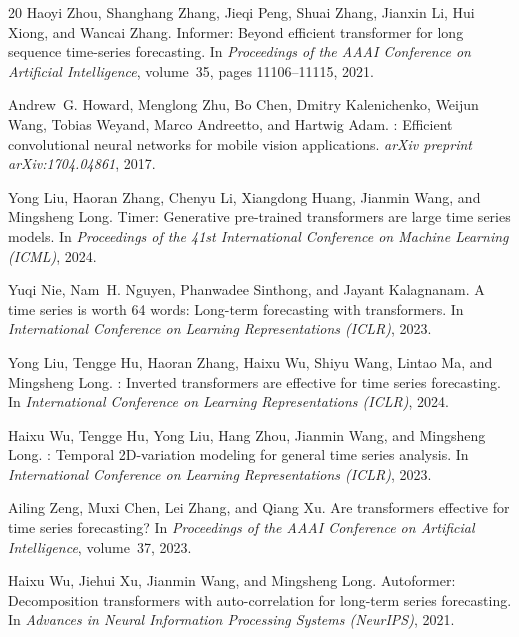 \documentclass{article}
\begin{document}
\begin{thebibliography}{20}
Haoyi Zhou, Shanghang Zhang, Jieqi Peng, Shuai Zhang, Jianxin Li, Hui Xiong, and Wancai Zhang.
\newblock Informer: Beyond efficient transformer for long sequence time-series forecasting.
\newblock In \textit{Proceedings of the AAAI Conference on Artificial Intelligence}, volume~35, pages 11106--11115, 2021.

Andrew~G. Howard, Menglong Zhu, Bo Chen, Dmitry Kalenichenko, Weijun Wang, Tobias Weyand, Marco Andreetto, and Hartwig Adam.
: Efficient convolutional neural networks for mobile vision applications.
\newblock \textit{arXiv preprint arXiv:1704.04861}, 2017.

Yong Liu, Haoran Zhang, Chenyu Li, Xiangdong Huang, Jianmin Wang, and Mingsheng Long.
\newblock Timer: Generative pre-trained transformers are large time series models.
\newblock In \textit{Proceedings of the 41st International Conference on Machine Learning (ICML)}, 2024.

Yuqi Nie, Nam~H. Nguyen, Phanwadee Sinthong, and Jayant Kalagnanam.
\newblock A time series is worth 64 words: Long-term forecasting with transformers.
\newblock In \textit{International Conference on Learning Representations (ICLR)}, 2023.

Yong Liu, Tengge Hu, Haoran Zhang, Haixu Wu, Shiyu Wang, Lintao Ma, and Mingsheng Long.
: Inverted transformers are effective for time series forecasting.
\newblock In \textit{International Conference on Learning Representations (ICLR)}, 2024.

Haixu Wu, Tengge Hu, Yong Liu, Hang Zhou, Jianmin Wang, and Mingsheng Long.
: Temporal 2{D}-variation modeling for general time series analysis.
\newblock In \textit{International Conference on Learning Representations (ICLR)}, 2023.

Ailing Zeng, Muxi Chen, Lei Zhang, and Qiang Xu.
\newblock Are transformers effective for time series forecasting?
\newblock In \textit{Proceedings of the AAAI Conference on Artificial Intelligence}, volume~37, 2023.

Haixu Wu, Jiehui Xu, Jianmin Wang, and Mingsheng Long.
\newblock Autoformer: Decomposition transformers with auto-correlation for long-term series forecasting.
\newblock In \textit{Advances in Neural Information Processing Systems (NeurIPS)}, 2021.


\end{thebibliography}
\end{document}
